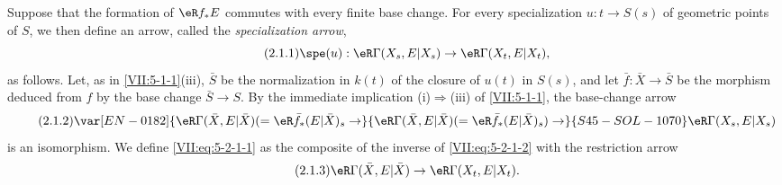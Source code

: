 Suppose that the formation of $\eR f_\ast E$ commutes with every finite base
change. For every specialization $u:t\to S(s)$ of geometric points of $S$,
we then define an arrow, called the \emph{specialization arrow},
\begin{equation*}\tag{2.1.1}\label{VII:eq:5-2-1-1}
  \spe(u):\eR\Gamma(X_s,E|X_s) \to \eR\Gamma(X_t,E|X_t) \text{,}
\end{equation*}
as follows. Let, as in \ref{VII:5-1-1}(iii), $\bar S$ be the normalization in
$k(t)$ of the closure of $u(t)$ in $S(s)$, and let
$\bar f:\bar X\to \bar S$ be the morphism deduced from $f$ by the base change
$\bar S\to S$. By the immediate implication (i)$\Rightarrow$(iii) of
\ref{VII:5-1-1}, the base-change arrow
\begin{equation*}\tag{2.1.2}\label{VII:eq:5-2-1-2}
  \var[EN-0182]{\eR\Gamma(\bar X,E|\bar X) (=\eR\bar f_\ast (E|\bar X)_s \to}{\eR\Gamma(\bar X,E|\bar X) (=\eR\bar f_\ast (E|\bar X)_s) \to}{S45-SOL-1070} \eR\Gamma(X_s,E|X_s) 
\end{equation*}
is an isomorphism. We define \eqref{VII:eq:5-2-1-1} as the composite of the
inverse of \eqref{VII:eq:5-2-1-2} with the restriction arrow
\begin{equation*}\tag{2.1.3}\label{VII:eq:5-2-1-3}
  \eR\Gamma(\bar X,E|\bar X) \to \eR\Gamma(X_t,E|X_t) \text{.}
\end{equation*}






\subsubsection{}\label{VII:5-2-2}

